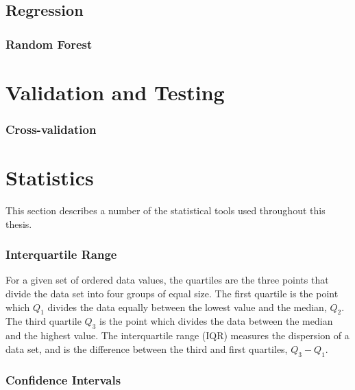 \subsection{Regression}


\subsubsection{Random Forest}


\section{Validation and Testing}


\subsubsection{Cross-validation}


\section{Statistics}

This section describes a number of the statistical tools used
throughout this thesis.




\subsubsection{Interquartile Range}

For a given set of ordered data values, the quartiles are the three
points that divide the data set into four groups of equal size. The
first quartile is the point which $Q_1$ divides the data equally
between the lowest value and the median, $Q_2$. The third quartile
$Q_3$ is the point which divides the data between the median and the
highest value. The interquartile range (IQR) measures the dispersion
of a data set, and is the difference between the third and first
quartiles, $Q_3 - Q_1$.


\subsubsection{Confidence Intervals}


